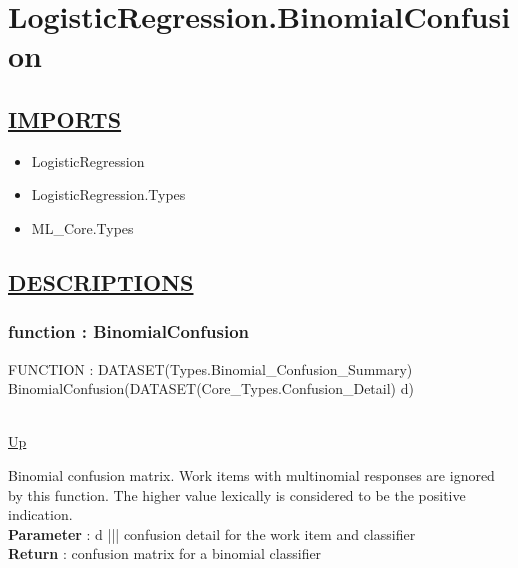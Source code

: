 \chapter*{LogisticRegression.BinomialConfusion}
\hypertarget{LogisticRegression.BinomialConfusion}{}

\section*{\underline{IMPORTS}}
\begin{itemize}
\item LogisticRegression
\item LogisticRegression.Types
\item ML\_Core.Types
\end{itemize}

\section*{\underline{DESCRIPTIONS}}
\subsection*{function : BinomialConfusion}
\hypertarget{ecldoc:logisticregression.binomialconfusion}{FUNCTION : DATASET(Types.Binomial\_Confusion\_Summary) BinomialConfusion(DATASET(Core\_Types.Confusion\_Detail) d)} \\
\hyperlink{ecldoc:}{Up} \\
\par
Binomial confusion matrix. Work items with multinomial responses are ignored by this function. The higher value lexically is considered to be the positive indication. \\
\textbf{Parameter} : d ||| confusion detail for the work item and classifier \\
\textbf{Return} : confusion matrix for a binomial classifier \\
